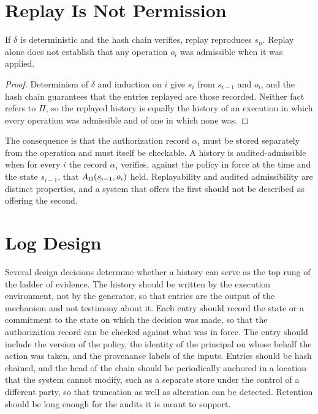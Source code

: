 \section{Replay Is Not Permission}

\begin{proposition}\label{prop:replay}
If $\delta$ is deterministic and the hash chain verifies, replay reproduces $s_n$. Replay alone does not establish that any operation $o_i$ was admissible when it was applied.
\end{proposition}

\begin{proof}
Determinism of $\delta$ and induction on $i$ give $s_i$ from $s_{i-1}$ and $o_i$, and the hash chain guarantees that the entries replayed are those recorded. Neither fact refers to $\Pi$, so the replayed history is equally the history of an execution in which every operation was admissible and of one in which none was.
\end{proof}

The consequence is that the authorization record $\alpha_i$ must be stored separately from the operation and must itself be checkable. A history is audited-admissible when for every $i$ the record $\alpha_i$ verifies, against the policy in force at the time and the state $s_{i-1}$, that $A_\Pi(s_{i-1},o_i)$ held. Replayability and audited admissibility are distinct properties, and a system that offers the first should not be described as offering the second.

\section{Log Design}

Several design decisions determine whether a history can serve as the top rung of the ladder of evidence. The history should be written by the execution environment, not by the generator, so that entries are the output of the mechanism and not testimony about it. Each entry should record the state or a commitment to the state on which the decision was made, so that the authorization record can be checked against what was in force. The entry should include the version of the policy, the identity of the principal on whose behalf the action was taken, and the provenance labels of the inputs. Entries should be hash chained, and the head of the chain should be periodically anchored in a location that the system cannot modify, such as a separate store under the control of a different party, so that truncation as well as alteration can be detected. Retention should be long enough for the audits it is meant to support.

